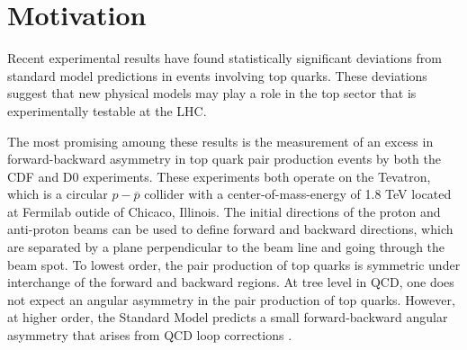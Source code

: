 
%
\section{Motivation}






Recent experimental results have found statistically significant deviations from standard model predictions in events involving top quarks.
These deviations suggest that new physical models may play a role in the top sector that is experimentally testable at the LHC.

The most promising amoung these results is the measurement of an excess in forward-backward asymmetry in top quark pair production events by both the CDF and D0 experiments.
These experiments both operate on the Tevatron, which is a circular $p-\overline{p}$ collider with a center-of-mass-energy of 1.8 TeV located at Fermilab outide of Chicaco, Illinois.
The initial directions of the proton and anti-proton beams can be used to define forward and backward directions, which are separated by a plane perpendicular to the beam line and going through the beam spot.
To lowest order, the pair production of top quarks is symmetric under interchange of the forward and backward regions.
At tree level in QCD, one does not expect an angular asymmetry in the pair production of top quarks.
However, at higher order, the Standard Model predicts a small forward-backward angular asymmetry that arises from QCD loop corrections \cite{Aaltonen:1318520}.

